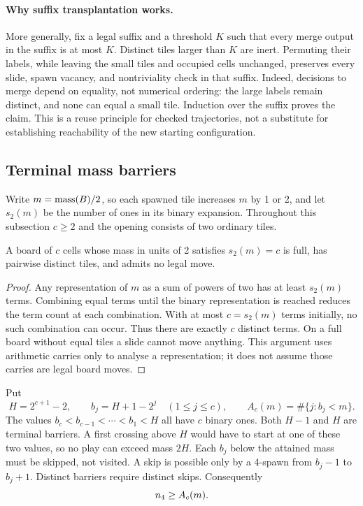 \paragraph{Why suffix transplantation works.}
More generally, fix a legal suffix and a threshold $K$ such that every
merge output in the suffix is at most $K$. Distinct tiles larger than $K$
are inert. Permuting their labels, while leaving the small tiles and
occupied cells unchanged, preserves every slide, spawn vacancy, and
nontriviality check in that suffix. Indeed, decisions to merge depend on
equality, not numerical ordering: the large labels remain distinct, and
none can equal a small tile. Induction over the suffix proves the claim.
This is a reuse principle for checked trajectories, not a substitute for
establishing reachability of the new starting configuration.

\subsection{Terminal mass barriers}
\label{sec:barriers}

Write $m=\mathrm{mass}(B)/2$, so each spawned tile increases $m$ by 1 or 2, and
let $s_2(m)$ be the number of ones in its binary expansion. Throughout
this subsection $c\ge2$ and the opening consists of two ordinary tiles.

\begin{lemma}\label{lem:barrier}
A board of $c$ cells whose mass in units of 2 satisfies $s_2(m)=c$ is full,
has pairwise distinct tiles, and admits no legal move.
\end{lemma}
\begin{proof}
Any representation of $m$ as a sum of powers of two has at least $s_2(m)$
terms. Combining equal terms until the binary representation is reached
reduces the term count at each combination. With at most $c=s_2(m)$
terms initially, no such combination can occur. Thus there are exactly
$c$ distinct terms. On a full board without equal tiles a slide cannot
move anything. This argument uses arithmetic carries only to analyse a
representation; it does not assume those carries are legal board moves.
\end{proof}

Put
\[
H=2^{c+1}-2,\qquad b_j=H+1-2^j\quad(1\le j\le c),\qquad
A_c(m)=\#\{j:b_j<m\}.
\]
The values $b_c<b_{c-1}<\cdots<b_1<H$ all have $c$ binary ones.
Both $H-1$ and $H$ are terminal barriers. A first crossing above $H$
would have to start at one of these two values, so no play can exceed
mass $2H$. Each $b_j$ below the attained mass must be skipped, not visited.
A skip is possible only by a 4-spawn from $b_j-1$ to $b_j+1$. Distinct
barriers require distinct skips. Consequently
\begin{equation}\label{eq:barrierfours}
n_4\ge A_c(m).
\end{equation}


